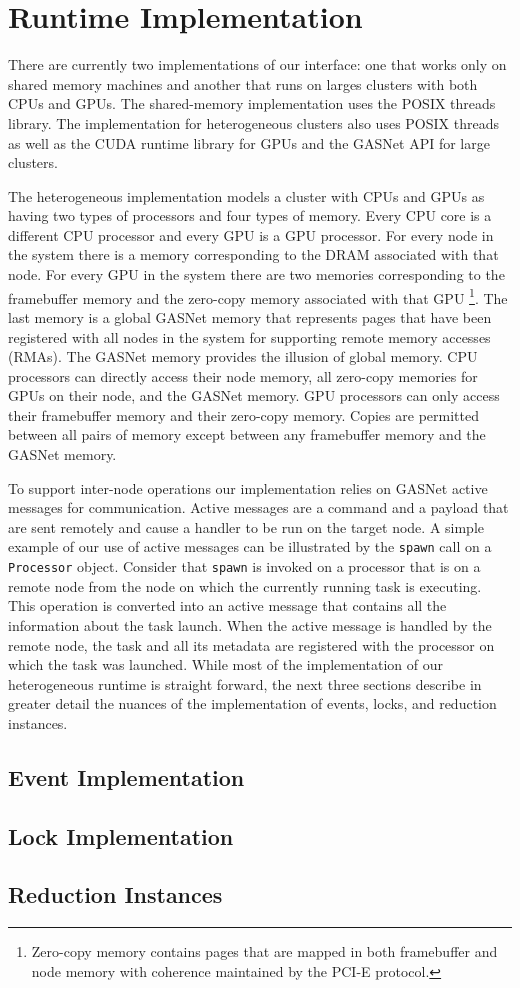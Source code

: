 
\section{Runtime Implementation}
\label{sec:impl}

There are currently two implementations of our interface:
one that works only on shared memory machines and another that
runs on larges clusters with both CPUs and GPUs.  The shared-memory
implementation uses the POSIX threads library.
The implementation for heterogeneous clusters also uses POSIX
threads as well as the CUDA runtime library for GPUs\cite{CUDA} and the GASNet
API for large clusters\cite{GASNET07}.  

The heterogeneous implementation
models a cluster with CPUs and GPUs as having two types of processors 
and four types of memory.  Every CPU core is a different CPU processor
and every GPU is a GPU processor.  For every node in the system
there is a memory corresponding to the DRAM associated with that node.  For
every GPU in the system there are two memories corresponding to the framebuffer
memory and the zero-copy memory associated with that GPU \footnote{Zero-copy 
memory contains pages that are mapped in both framebuffer and node memory with
coherence maintained by the PCI-E protocol.}. The last memory is 
a global GASNet memory that represents pages that have been registered 
with all nodes in the system for supporting remote memory accesses (RMAs).
The GASNet memory provides the illusion of global memory.  CPU processors
can directly access their node memory, all zero-copy memories for GPUs on
their node, and the GASNet memory.  GPU processors can only access their
framebuffer memory and their zero-copy memory.  Copies are permitted
between all pairs of memory except between any framebuffer memory and
the GASNet memory.

To support inter-node operations our implementation relies on GASNet active
messages for communication.  Active messages are a command and a payload
that are sent remotely and cause a handler to be run on the target node.
A simple example of our use of active messages can be illustrated by the 
{\tt spawn} call on a {\tt Processor} object.  Consider that {\tt spawn}
is invoked on a processor that is on a remote node from the node on which
the currently running task is executing.  This operation is converted into
an active message that contains all the information about the task launch.
When the active message is handled by the remote node, the task and all its
metadata are registered with the processor on which the task was launched.
While most of the implementation of our heterogeneous runtime is straight
forward, the next three sections describe in greater detail the nuances
of the implementation of events, locks, and reduction instances.

\subsection{Event Implementation}
\label{subsec:eventimpl}

\subsection{Lock Implementation}
\label{subsec:lockimpl}

\subsection{Reduction Instances}
\label{subsec:reducimpl}
